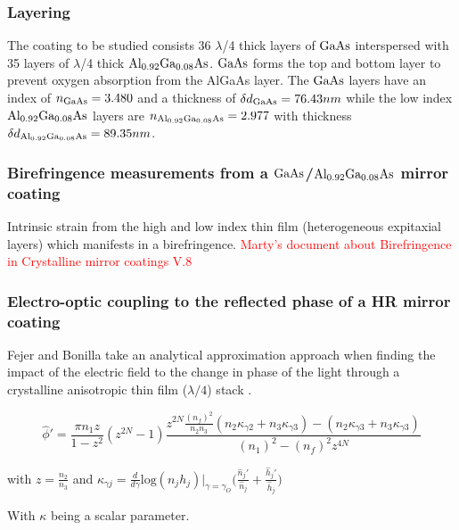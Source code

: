 \subsubsection{Layering}
The coating to be studied consists 36 $\lambda$/4  thick layers of $\mathrm{GaAs}$ interspersed with 35 layers of $\lambda$/4 thick $\mathrm{Al_{0.92}Ga_{0.08}As}$.   $\mathrm{GaAs}$ forms the top and bottom layer to prevent oxygen absorption from the AlGaAs layer. The $\mathrm{GaAs}$ layers have an index of $n_{\mathrm{GaAs}} = 3.480$ and a thickness of $\delta d_{\mathrm{GaAs}} = 76.43 nm$ while the low index $\mathrm{Al_{0.92}Ga_{0.08}As}$ layers are $n_{\mathrm{Al_{0.92}Ga_{0.08}As}} = 2.977$ with thickness $\delta d_{\mathrm{Al_{0.92}Ga_{0.08}As}} = 89.35 nm$.



\subsubsection{Birefringence measurements from a $\mathrm{GaAs}$/$\mathrm{Al_{0.92}Ga_{0.08}As}$ mirror coating}
Intrinsic strain from the high and low index thin film (heterogeneous expitaxial layers) which manifests in a birefringence. \cite{Cole:2013} \textcolor{red}{Marty's document about Birefringence in Crystalline mirror coatings V.8}



\subsubsection{Electro-optic coupling to the reflected phase of a HR mirror coating}
Fejer and Bonilla take an analytical approximation approach when finding the impact of the electric field to the change in phase of the light through a crystalline anisotropic thin film ($\lambda/4$) stack \cite{bonilla_fejer}.

\begin{equation}
\hat{\phi}' = \frac{\pi n_1 z}{1-z^2}(z^{2N} -1) \frac{z^{2N} \frac{(n_f)^2}{n_2 n_3}(n_2 \kappa_{\gamma 2} + n_3\kappa_{\gamma 3}) - (n_2 \kappa_{\gamma 3} + n_3\kappa_{\gamma 3})}{(n_1)^2 -(n_f)^2 z^{4N}}
\end{equation}

with $z = \frac{n_2}{n_3}$
and
$
\kappa_{\gamma j} = \frac{d}{d \gamma} \mathrm{log}(n_j h_j)|_{\gamma =\gamma_{O}} \bigg(\frac{\hat{n}_j'}{\hat{n}_j} +\frac{\hat{h}_j'}{\hat{h}_j} \bigg)
$

With $\kappa$ being a scalar parameter.

